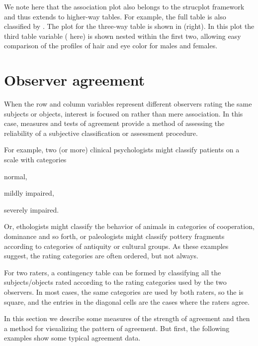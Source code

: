 \documentclass[10pt,krantz2]{krantz}\usepackage[]{graphicx}\usepackage[]{color}
\begin{document}
We note here that the association plot also belongs to the
strucplot framework and thus extends to higher-way tables.
For example, the full  table is
also classified by .
The plot for the three-way table
is shown in  (right).
In this plot the third table
variable ( here) is shown nested within the first two,
allowing easy comparison of the profiles of hair and eye color
for males and females.


\section{Observer agreement}\label{sec:twoway-agree}
When the row and column variables represent different
observers rating the same subjects or objects, interest is focused on
 rather than mere association.
In this case, measures and tests
of agreement provide a method of assessing the
reliability of a subjective classification or assessment procedure.

For example, two (or more) clinical psychologists might classify
patients on a scale with categories
\begin{seriate}
\item normal,
\item mildly impaired,
\item severely impaired.
\end{seriate}
Or, ethologists might classify the behavior
of animals in categories of cooperation, dominance and so forth,
or paleologists might classify pottery fragments according to
categories of antiquity or cultural groups. As these examples
suggest, the rating categories are often ordered, but not always.

For two raters, a
contingency table can be
formed by classifying all the subjects/objects rated
according to the rating categories used by the two
observers.
In most cases, the same categories are used by both raters,
so the \ctab is square, and the entries in the diagonal cells
are the cases where the raters agree.

In this section we describe some measures of the strength
of agreement and then a method for visualizing the pattern of
agreement.  But first, the following examples show some
typical agreement data.
\end{document}
